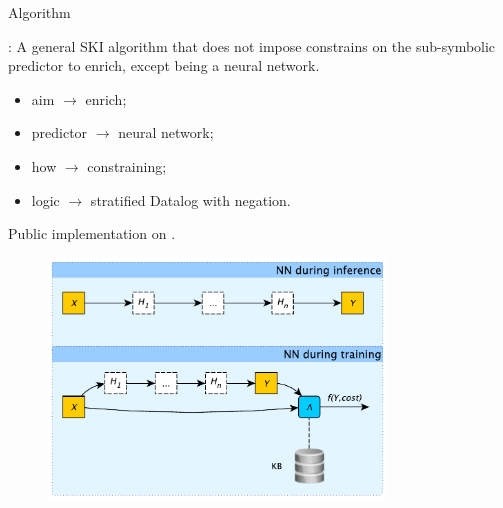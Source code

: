 \documentclass[presentation]{beamer}\mode<presentation>{\usetheme{AMSBolognaFC}}
\begin{document}
\begin{frame}[allowframebreaks]{Algorithm}
    \begin{block}{\killshort: \killlong}
        A general SKI algorithm that does not impose constrains on the sub-symbolic predictor to enrich, except being a neural network.
        \begin{itemize}
            \item aim $\rightarrow$ enrich;
            \item predictor $\rightarrow$ neural network;
            \item how $\rightarrow$ constraining;
            \item logic $\rightarrow$ stratified Datalog with negation.
        \end{itemize}
    \end{block}
    Public implementation on \psyki{} .
    
    \framebreak
    
    \begin{figure}
        \centering
        \includegraphics[width=0.8\textwidth]{figures/lambda-layer.pdf}
    \end{figure}
    
    \framebreak
    
    
    
    \framebreak
    

\end{frame}
\end{document}
